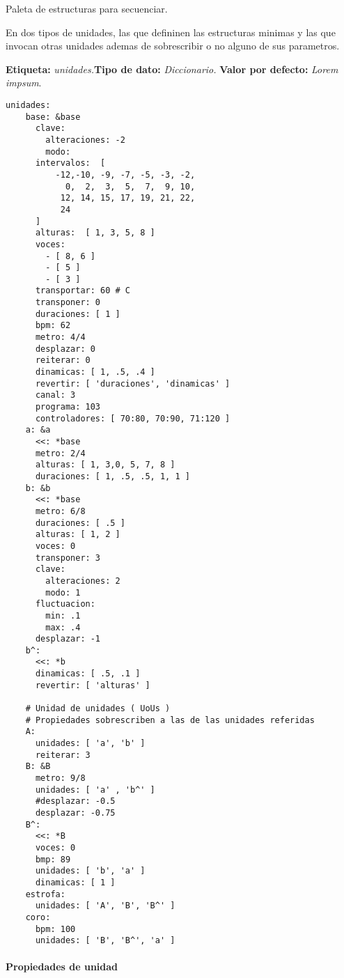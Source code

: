 \documentclass[]{article}
\let\oldparagraph\paragraph
\renewcommand{\paragraph}[1]{\oldparagraph{#1}\mbox{}}
\begin{document}
Paleta de estructuras para secuenciar.

En dos tipos de unidades, las que defininen las estructuras minimas y
las que invocan otras unidades ademas de sobrescribir o no alguno de sus
parametros.

\textbf{Etiqueta:} \emph{unidades.}\newline \textbf{Tipo de dato:}
\emph{Diccionario.} \newline \textbf{Valor por defecto:} \emph{Lorem
impsum}.\newline

\begin{verbatim}
unidades:
    base: &base 
      clave:
        alteraciones: -2
        modo:
      intervalos:  [ 
          -12,-10, -9, -7, -5, -3, -2,
            0,  2,  3,  5,  7,  9, 10,
           12, 14, 15, 17, 19, 21, 22,
           24
      ]
      alturas:  [ 1, 3, 5, 8 ] 
      voces: 
        - [ 8, 6 ] 
        - [ 5 ] 
        - [ 3 ]
      transportar: 60 # C
      transponer: 0
      duraciones: [ 1 ]
      bpm: 62
      metro: 4/4
      desplazar: 0
      reiterar: 0
      dinamicas: [ 1, .5, .4 ]
      revertir: [ 'duraciones', 'dinamicas' ]
      canal: 3
      programa: 103
      controladores: [ 70:80, 70:90, 71:120 ]
    a: &a 
      <<: *base
      metro: 2/4
      alturas: [ 1, 3,0, 5, 7, 8 ]
      duraciones: [ 1, .5, .5, 1, 1 ]
    b: &b 
      <<: *base
      metro: 6/8
      duraciones: [ .5 ]
      alturas: [ 1, 2 ]
      voces: 0
      transponer: 3
      clave: 
        alteraciones: 2
        modo: 1 
      fluctuacion: 
        min: .1
        max: .4 
      desplazar: -1
    b^: 
      <<: *b
      dinamicas: [ .5, .1 ]
      revertir: [ 'alturas' ]
    
    # Unidad de unidades ( UoUs )
    # Propiedades sobrescriben a las de las unidades referidas 
    A: 
      unidades: [ 'a', 'b' ] 
      reiterar: 3
    B: &B 
      metro: 9/8
      unidades: [ 'a' , 'b^' ]
      #desplazar: -0.5
      desplazar: -0.75
    B^: 
      <<: *B
      voces: 0 
      bmp: 89
      unidades: [ 'b', 'a' ] 
      dinamicas: [ 1 ]
    estrofa: 
      unidades: [ 'A', 'B', 'B^' ]
    coro: 
      bpm: 100
      unidades: [ 'B', 'B^', 'a' ]
\end{verbatim}

\hypertarget{propiedades-de-unidad}{%
\paragraph{Propiedades de unidad}\label{propiedades-de-unidad}}
\end{document}
